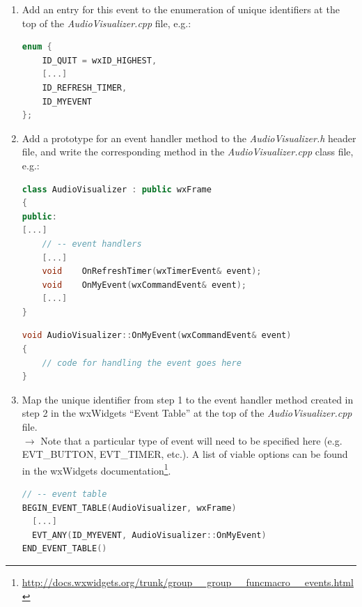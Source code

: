 \documentclass[12pt]{report}
\begin{document}
\begin{enumerate}
	\item Add an entry for this event to the enumeration of unique identifiers at the top of the \emph{AudioVisualizer.cpp} file, e.g.:
\begin{lstlisting}[language=C++,title=\emph{AudioVisualizer.cpp}]
enum {
	ID_QUIT = wxID_HIGHEST,
	[...]
	ID_REFRESH_TIMER,
	ID_MYEVENT
};
\end{lstlisting}
\clearpage
	\item Add a prototype for an event handler method to the \emph{AudioVisualizer.h} header file, and write the corresponding method in the \emph{AudioVisualizer.cpp} class file, e.g.:
\begin{lstlisting}[language=C++,title=\emph{AudioVisualizer.h}]
class AudioVisualizer : public wxFrame 
{
public:
[...]
	// -- event handlers
	[...]
	void	OnRefreshTimer(wxTimerEvent& event);
	void	OnMyEvent(wxCommandEvent& event);
	[...]
}
\end{lstlisting}
\begin{lstlisting}[language=C++,title=\emph{AudioVisualizer.cpp}]
void AudioVisualizer::OnMyEvent(wxCommandEvent& event)
{
	// code for handling the event goes here
}
\end{lstlisting}
	\item Map the unique identifier from step 1 to the event handler method created in step 2 in the wxWidgets ``Event Table'' at the top of the \emph{AudioVisualizer.cpp} file.\\
	$\rightarrow$ Note that a particular type of event will need to be specified here (e.g. EVT{\_}BUTTON, EVT{\_}TIMER, etc.). A list of viable options can be found in the wxWidgets documentation\footnote{\url{http://docs.wxwidgets.org/trunk/group__group__funcmacro__events.html}}.
\begin{lstlisting}[language=C++,title=\emph{AudioVisualizer.cpp}]
// -- event table
BEGIN_EVENT_TABLE(AudioVisualizer, wxFrame)
  [...]
  EVT_ANY(ID_MYEVENT, AudioVisualizer::OnMyEvent)
END_EVENT_TABLE()
\end{lstlisting}
\end{enumerate}
\clearpage
\end{document}
